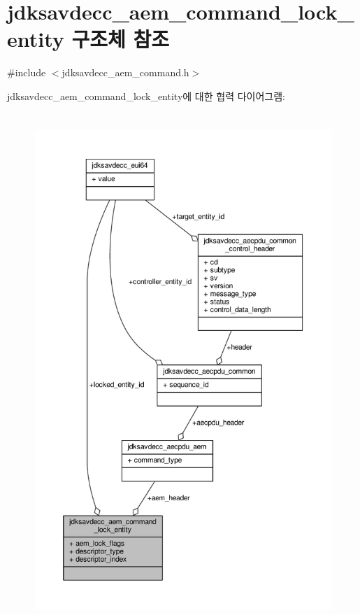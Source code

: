 \hypertarget{structjdksavdecc__aem__command__lock__entity}{}\section{jdksavdecc\+\_\+aem\+\_\+command\+\_\+lock\+\_\+entity 구조체 참조}
\label{structjdksavdecc__aem__command__lock__entity}


{\ttfamily \#include $<$jdksavdecc\+\_\+aem\+\_\+command.\+h$>$}



jdksavdecc\+\_\+aem\+\_\+command\+\_\+lock\+\_\+entity에 대한 협력 다이어그램\+:
\nopagebreak
\begin{figure}[H]
\begin{center}
\leavevmode
\includegraphics[height=550pt]{structjdksavdecc__aem__command__lock__entity__coll__graph}
\end{center}
\end{figure}
